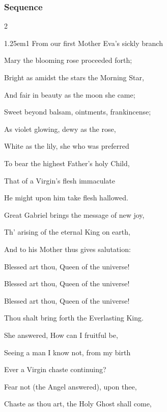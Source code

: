 \clearpage
\subsubsection{Sequence}

\vspace{-0.5\baselineskip}

\begin{multicols}{2}
\begin{hangparas}{1.25em}{1}
From our first Mother Eva's sickly branch

Mary the blooming rose proceeded forth;

Bright as amidst the stars the Morning Star,

And fair in beauty as the moon she came;

\vspace{0.5\baselineskip}

Sweet beyond balsam, ointments, frankincense;

As violet glowing, dewy as the rose,

White as the lily, she who was preferred

To bear the highest Father's holy Child,

That of a Virgin's flesh immaculate

He might upon him take flesh hallowed.

Great Gabriel brings the message of new joy,

Th' arising of the eternal King on earth,

\vspace{0.5\baselineskip}

And to his Mother thus gives salutation:

Blessed art thou, Queen of the universe!

Blessed art thou, Queen of the universe!

Blessed art thou, Queen of the universe!

Thou shalt bring forth the Everlasting King.

She answered, How can I fruitful be,

\vspace{0.5\baselineskip}

Seeing a man I know not, from my birth

Ever a Virgin chaste continuing?

Fear not (the Angel answered), upon thee,

Chaste as thou art, the Holy Ghost shall come,


\end{hangparas}
\end{multicols}
